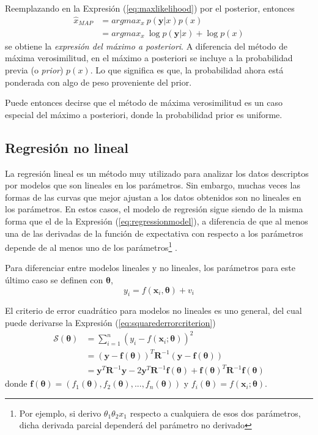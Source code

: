 Reemplazando en la Expresión (\ref{eq:maxlikelihood}) por el posterior, entonces
\begin{align}
    \hat{x}_{MAP} &= argmax_x\ p(\bm{y}|x)p(x) \\
                  &= argmax_x\ \log p(\bm{y}|x) + \log p(x)
\end{align}
se obtiene la \textit{expresión del máximo a posteriori}. A diferencia del método de máxima verosimilitud, en el máximo a posteriori se incluye a la probabilidad previa (o \textit{prior}) $p(x)$. Lo que significa es que, la probabilidad ahora está ponderada con algo de peso proveniente del prior.

Puede entonces decirse que el método de máxima verosimilitud es un caso especial del máximo a posteriori, donde la probabilidad prior es uniforme.

\subsection{Regresión no lineal}

La regresión lineal es un método muy utilizado para analizar los datos descriptos por modelos que son lineales en los parámetros. Sin embargo, muchas veces las formas de las curvas que mejor ajustan a los datos obtenidos son no lineales en los parámetros. En estos casos, el modelo de regresión sigue siendo de la misma forma que el de la Expresión (\ref{eq:regressionmodel}), a diferencia de que al menos una de las derivadas de la función de expectativa con respecto a los parámetros depende de al menos uno de los parámetros\footnote{Por ejemplo, si derivo $\theta_1 \theta_2 x_1$ respecto a cualquiera de esos dos parámetros, dicha derivada parcial dependerá del parámetro no derivado} \cite{madsen2004}\cite{nguk2017}.

Para diferenciar entre modelos lineales y no lineales, los parámetros para este último caso se definen con $\bm{\theta}$,
\begin{equation}
    y_i = f(\bm{x}_i, \bm{\theta}) + v_i
    \label{eq:nonlinearregressionmodel}
\end{equation}

El criterio de error cuadrático para modelos no lineales es uno general, del cual puede derivarse la Expresión (\ref{eq:squarederrorcriterion})
\begin{align}
    \mathscr{S}(\bm{\theta}) &= \sum_{i=1}^n (y_i - f(\bm{x}_i;\bm{\theta}))^2 \\
                   &= (\bm{y} - \bm{f}(\bm{\theta}))^T\bm{R}^{-1}(\bm{y} - \bm{f}(\bm{\theta})) \\
                   &= \bm{y}^T \bm{R}^{-1}\bm{y} - 2\bm{y}^T\bm{R}^{-1}\bm{f}(\bm{\theta}) + \bm{f}(\bm{\theta})^T\bm{R}^{-1}\bm{f}(\bm{\theta})
    \label{eq:generalsquarederrorcriterion}
\end{align}
donde $\bm{f}(\bm{\theta}) = (f_1(\bm{\theta}), f_2(\bm{\theta}), ..., f_n(\bm{\theta}))$ y $f_i(\bm{\theta}) = f(\bm{x}_i;\bm{\theta})$.

